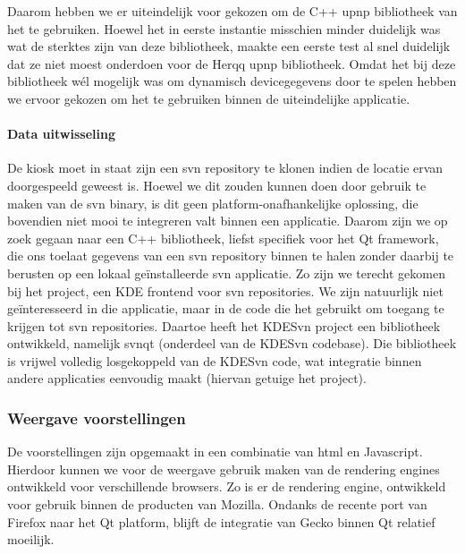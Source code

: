 Daarom hebben we er uiteindelijk voor gekozen om de C++ \ac{upnp} bibliotheek van het  te gebruiken. Hoewel het in eerste instantie misschien minder duidelijk was wat de sterktes zijn van deze bibliotheek, maakte een eerste test al snel duidelijk dat ze niet moest onderdoen voor de Herqq \ac{upnp} bibliotheek. Omdat het bij deze bibliotheek wél mogelijk was om dynamisch devicegegevens door te spelen hebben we ervoor gekozen om het te gebruiken binnen de uiteindelijke applicatie.

\paragraph{Data uitwisseling} De kiosk moet in staat zijn een \ac{svn} repository te klonen indien de locatie ervan doorgespeeld geweest is. Hoewel we dit zouden kunnen doen door gebruik te maken van de \ac{svn} binary, is dit geen platform-onafhankelijke oplossing, die bovendien niet mooi te integreren valt binnen een applicatie. Daarom zijn we op zoek gegaan naar een C++ bibliotheek, liefst specifiek voor het Qt framework, die ons toelaat gegevens van een \ac{svn} repository binnen te halen zonder daarbij te berusten op een lokaal geïnstalleerde \ac{svn} applicatie. Zo zijn we terecht gekomen bij het  project, een KDE frontend voor \ac{svn} repositories. We zijn natuurlijk niet geïnteresseerd in die applicatie, maar in de code die het gebruikt om toegang te krijgen tot \ac{svn} repositories. Daartoe heeft het KDESvn project een bibliotheek ontwikkeld, namelijk svnqt (onderdeel van de KDESvn codebase). Die bibliotheek is vrijwel volledig losgekoppeld van de KDESvn code, wat integratie binnen andere applicaties eenvoudig maakt (hiervan getuige het  project).

\subsubsection{Weergave voorstellingen}

De voorstellingen zijn opgemaakt in een combinatie van \ac{html} en Javascript. Hierdoor kunnen we voor de weergave gebruik maken van de rendering engines ontwikkeld voor verschillende browsers. Zo is er de  rendering engine, ontwikkeld voor gebruik binnen de producten van Mozilla. Ondanks de recente port van Firefox naar het Qt platform, blijft de integratie van Gecko binnen Qt relatief moeilijk.

